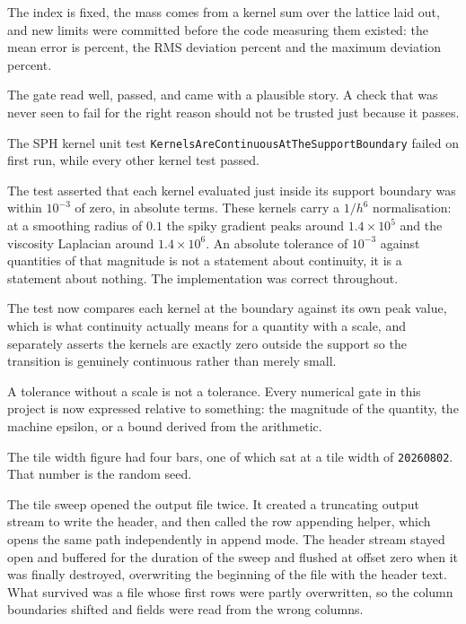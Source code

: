  The index is fixed, the mass comes from a kernel sum over the lattice laid out, and new
limits were committed before the code measuring them existed: the mean error is
\SphDensityErrorPercent{} percent, the RMS deviation \SphDensityRmsPercent{} percent and the maximum
deviation \SphDensityMaxPercent{} percent.

 The gate read well, passed, and came with a plausible story. A
check that was never seen to fail for the right reason should not be trusted just because it passes.


 The SPH kernel unit test
\texttt{KernelsAreContinuousAtTheSupportBoundary} failed on first run, while
every other kernel test passed.

 The test asserted that each kernel evaluated just inside its
support boundary was within $10^{-3}$ of zero, in absolute terms. These kernels
carry a $1/h^6$ normalisation: at a smoothing radius of $0.1$ the spiky
gradient peaks around $1.4 \times 10^5$ and the viscosity Laplacian around
$1.4 \times 10^6$. An absolute tolerance of $10^{-3}$ against quantities of that
magnitude is not a statement about continuity, it is a statement about nothing.
The implementation was correct throughout.

 The test now compares each kernel at the boundary against its own
peak value, which is what continuity actually means for a quantity with a
scale, and separately asserts the kernels are exactly zero outside the support
so the transition is genuinely continuous rather than merely small.

 A tolerance without a scale is not a tolerance. Every numerical
gate in this project is now expressed relative to something: the magnitude of
the quantity, the machine epsilon, or a bound derived from the arithmetic.


 The tile width figure had four bars, one of which sat at a
tile width of \texttt{20260802}. That number is the random seed.

 The tile sweep opened the output file twice. It created a
truncating output stream to write the header, and then called the row appending
helper, which opens the same path independently in append mode. The header
stream stayed open and buffered for the duration of the sweep and flushed at
offset zero when it was finally destroyed, overwriting the beginning of the
file with the header text. What survived was a file whose first rows were
partly overwritten, so the column boundaries shifted and fields were read from
the wrong columns.

